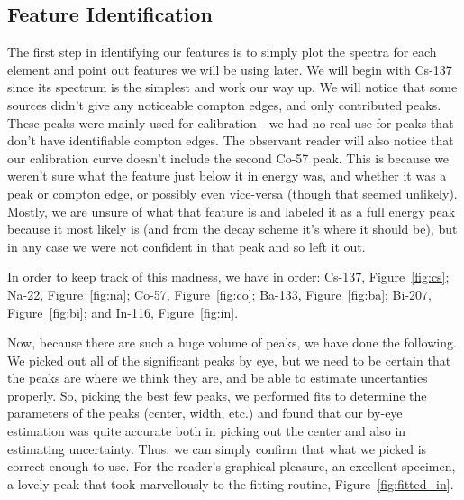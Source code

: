 \documentclass[reprint, nobibnotes, amssymb, amsmath, amsfonts, physics, mathtools, mathrsfs, floatfix]{revtex4-1}
\begin{document}
    \subsection{Feature Identification}
      The first step in identifying our features is to simply plot the spectra for each element and point out features we will be using later.  We will begin with Cs-137 since its spectrum is the simplest and work our way up.  We will notice that some sources didn't give any noticeable compton edges, and only contributed peaks.  These peaks were mainly used for calibration - we had no real use for peaks that don't have identifiable compton edges.  The observant reader will also notice that our calibration curve doesn't include the second Co-57 peak.  This is because we weren't sure what the feature just below it in energy was, and whether it was a peak or compton edge, or possibly even vice-versa (though that seemed unlikely).  Mostly, we are unsure of what that feature is and labeled it as a full energy peak because it most likely is (and from the decay scheme it's where it should be), but in any case we were not confident in that peak and so left it out.

      In order to keep track of this madness, we have in order: Cs-137, Figure~\ref{fig:cs}; Na-22, Figure~\ref{fig:na}; Co-57, Figure~\ref{fig:co}; Ba-133, Figure~\ref{fig:ba}; Bi-207, Figure~\ref{fig:bi}; and In-116, Figure~\ref{fig:in}.

      \hspace{.25cm}

      Now, because there are such a huge volume of peaks, we have done the following.  We picked out all of the significant peaks by eye, but we need to be certain that the peaks are where we think they are, and be able to estimate uncertanties properly.  So, picking the best few peaks, we performed fits to determine the parameters of the peaks (center, width, etc.) and found that our by-eye estimation was quite accurate both in picking out the center and also in estimating uncertainty.  Thus, we can simply confirm that what we picked is correct enough to use.  For the reader's graphical pleasure, an excellent specimen, a lovely peak that took marvellously to the fitting routine, Figure~\ref{fig:fitted_in}.
\end{document}
